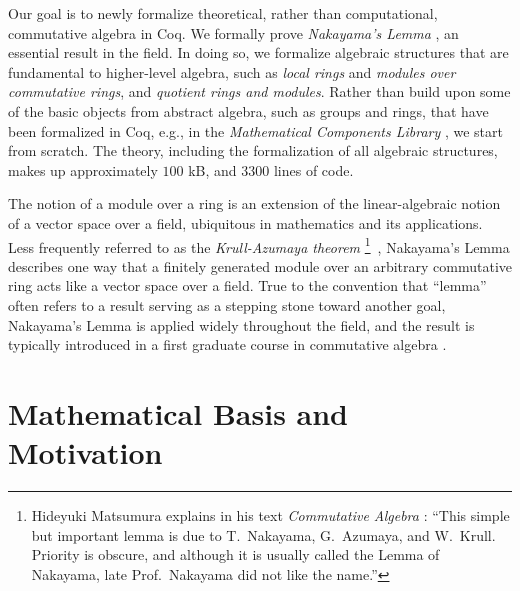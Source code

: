 \documentclass[referee,sn-mathphys]{sn-jnl}
\theoremstyle{definition}
\theoremstyle{remark}
\numberwithin{equation}{section}
\numberwithin{figure}{subsection}
\begin{document}
Our goal is to newly formalize theoretical, rather than computational,
commutative algebra in Coq. We formally prove \emph{Nakayama's Lemma}
\cite{nakayama-1951, azumaya}, an essential result in the field. In doing so,
we formalize algebraic structures that are fundamental to higher-level algebra,
such as \emph{local rings} and \emph{modules over commutative rings}, and
\emph{quotient rings and modules}. Rather than build upon some of the basic
objects from abstract algebra, such as groups and rings, that have been
formalized in Coq, e.g., in the \emph{Mathematical Components Library}
\cite{mathcomp}, we start from scratch.
The theory, including the formalization of all algebraic structures, makes up
approximately $100$ kB, and 3300 lines of code.
 
The notion of a module over a ring is an extension of the linear-algebraic
notion of a vector space over a field, ubiquitous in mathematics and its
applications. Less frequently referred to as the \emph{Krull-Azumaya theorem}
\footnote{Hideyuki Matsumura explains in his text \emph{Commutative Algebra}
  \cite{matsumura}: ``{This simple but important lemma is due to T.\ Nakayama,
  G.\ Azumaya, and W.\ Krull. Priority is obscure, and although it is usually
  called the Lemma of Nakayama, late Prof.\  Nakayama did not like the
  name.''}}
\,\cite{nagata}, Nakayama's Lemma describes one way that a finitely generated
module over an arbitrary commutative ring acts like a vector space over a
field. True to the convention that ``lemma'' often refers to a result serving
as a stepping stone toward another goal, Nakayama's Lemma is applied widely
throughout the field, and the result is typically introduced in a first
graduate course in commutative algebra \cite{atiyah-macdonald, matsumura,
eisenbud}.


\section{Mathematical Basis and Motivation}
\end{document}
